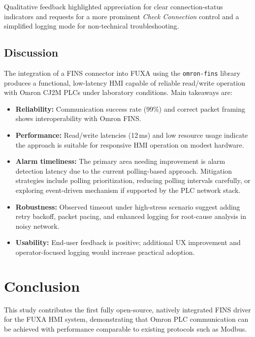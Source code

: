 Qualitative feedback highlighted appreciation for clear connection-status indicators and requests for a more prominent \textit{Check Connection} control and a simplified logging mode for non-technical troubleshooting.

\subsection{Discussion}
The integration of a FINS connector into FUXA using the \texttt{omron-fins} library produces a functional, low-latency HMI capable of reliable read/write operation with Omron CJ2M PLCs under laboratory conditions. Main takeaways are:
\begin{itemize}
\item \textbf{Reliability:} Communication success rate (99\%) and correct packet framing shows interoperability with Omron FINS.
\item \textbf{Performance:} Read/write latencies (12\,ms) and low resource usage indicate the approach is suitable for responsive HMI operation on modest hardware.
\item \textbf{Alarm timeliness:} The primary area needing improvement is alarm detection latency due to the current polling-based approach. Mitigation strategies include polling prioritization, reducing polling intervals carefully, or exploring event-driven mechanism if supported by the PLC network stack.
\item \textbf{Robustness:} Observed timeout under high-stress scenario suggest adding retry backoff, packet pacing, and enhanced logging for root-cause analysis in noisy network.
\item \textbf{Usability:} End-user feedback is positive; additional UX improvement and operator-focused logging would increase practical adoption.
\end{itemize}

\section{Conclusion}

This study contributes the first fully open-source, natively integrated FINS driver for the FUXA HMI system, demonstrating that Omron PLC communication can be achieved with performance comparable to existing protocols such as Modbus.

